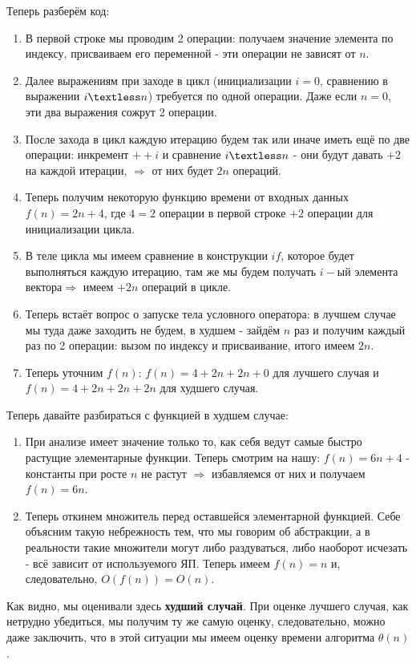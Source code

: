 Теперь разберём код:
\begin{enumerate}
    \item В первой строке мы проводим 2 операции: получаем значение элемента по индексу, присваиваем его переменной - эти операции не зависят от $n$.
    \item Далее выражениям при заходе в цикл (инициализации $i = 0$, сравнению в выражении $i \textless n$) требуется по одной операции. Даже если $n = 0$, эти два выражения сожрут 2 операции.
    \item После захода в цикл каждую итерацию будем так или иначе иметь ещё по две операции: инкремент $++i$ и сравнение $i \textless n$ - они будут давать $+2$ на каждой итерации, $\Rightarrow$ от них будет $2n$ операций.
    \item Теперь получим некоторую функцию времени от входных данных $f(n) = 2n + 4$, где $4 = 2$ операции в первой строке $+ 2$ операции для инициализации цикла. 
    \item В теле цикла мы имеем сравнение в конструкции $if$, которое будет выполняться каждую итерацию, там же мы будем получать $i-ый$ элемента вектора$\Rightarrow$ имеем $+2n$ операций в цикле.
    \item Теперь встаёт вопрос о запуске тела условного оператора: в лучшем случае мы туда даже заходить не будем, в худшем - зайдём $n$ раз и получим каждый раз по 2 операции: вызом по индексу и присваивание, итого имеем $2n$.
    \item Теперь уточним $f(n)$: $f(n) = 4 + 2n + 2n + 0$ для лучшего случая и $f(n) = 4 + 2n + 2n + 2n$ для худшего случая.
\end{enumerate}
Теперь давайте разбираться с функцией в худшем случае:
\begin{enumerate}
    \item При анализе имеет значение только то, как себя ведут самые быстро растущие элементарные функции. Теперь смотрим на нашу: $f(n) = 6n + 4$ - константы при росте $n$ не растут $\Rightarrow$ избавляемся от них и получаем $f(n) = 6n$.
    \item Теперь откинем множитель перед оставшейся элементарной функцией. Себе объясним такую небрежность тем, что мы говорим об абстракции, а в реальности такие множители могут либо раздуваться, либо наоборот исчезать - всё зависит от используемого ЯП. Теперь имеем $f(n) = n$ и, следовательно, $O(f(n)) = O(n)$.
\end{enumerate}

\begin{notice}
    Как видно, мы оценивали здесь \textbf{худший случай}. При оценке лучшего случая, как нетрудно убедиться, мы получим ту же самую оценку, следовательно, можно даже заключить, что в этой ситуации мы имеем оценку времени алгоритма $\theta(n)$.
\end{notice}

